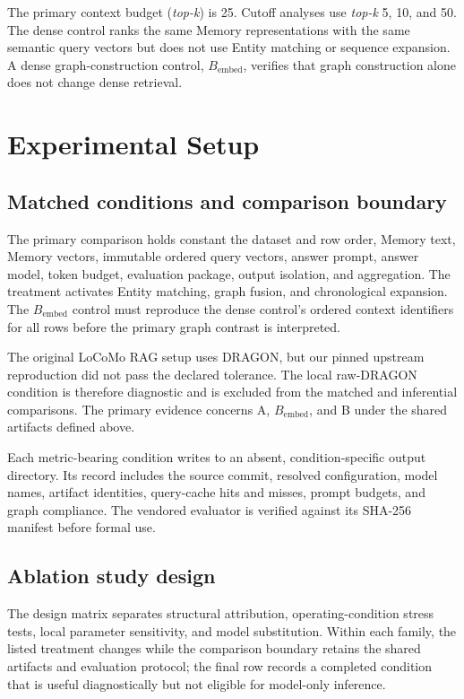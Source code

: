 \documentclass[10pt,twocolumn]{article}
\newcommand{\bembed}{B_{\mathrm{embed}}}
\newcommand{\topk}{\textit{top-k}}
\begin{document}
The primary context budget (\topk{}) is 25. Cutoff analyses use \topk{} 5, 10,
and 50. The dense control ranks the same Memory representations with the same
semantic query vectors but does not use Entity matching or sequence expansion.
A dense graph-construction control, \(\bembed\), verifies that graph
construction alone does not change dense retrieval.

\section{Experimental Setup}

\subsection{Matched conditions and comparison boundary}

The primary comparison holds constant the dataset and row order, Memory text,
Memory vectors, immutable ordered query vectors, answer prompt, answer model,
token budget, evaluation package, output isolation, and aggregation. The
treatment activates Entity matching, graph fusion, and chronological
expansion. The \(\bembed\) control must reproduce the dense control's ordered
context identifiers for all rows before the primary graph contrast is
interpreted.

The original LoCoMo RAG setup uses DRAGON, but our pinned upstream
reproduction did not pass the declared tolerance. The local raw-DRAGON
condition is therefore diagnostic and is excluded from the matched and
inferential comparisons. The primary evidence concerns A, \(\bembed\), and B
under the shared artifacts defined above.

Each metric-bearing condition writes to an absent, condition-specific output
directory. Its record includes the source commit, resolved configuration,
model names, artifact identities, query-cache hits and misses, prompt budgets,
and graph compliance. The vendored evaluator is verified against its SHA-256
manifest before formal use.

\subsection{Ablation study design}

The design matrix separates structural attribution, operating-condition
stress tests, local parameter sensitivity, and model substitution.
Within each family, the listed treatment changes while the comparison boundary
retains the shared artifacts and evaluation protocol; the final row records a
completed condition that is useful diagnostically but not eligible for
model-only inference.
\end{document}
